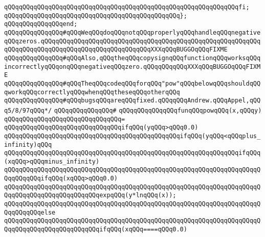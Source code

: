 \verb|qQQqqQQqqQQqqQQqqQQqqQQqqQQqqQQqqQQqqQQqqQQqqQQqqQQqqQQqqQQqqQQqfi;|\newline
\verb|qQQqqQQqqQQqqQQqqQQqqQQqqQQqqQQqqQQqqQQqqQQqqQQq};|\newline
\verb|qQQqqQQqqQQqqQQqend;|\newline
\newline
\verb|qQQqqQQqqQQqqQQq#qQQqWeqQQqdoqQQqnotqQQqproperlyqQQqhandleqQQqnegativeqQQqzeros.qQQqqQQqqQQqqQQqqQQqqQQqqQQqqQQqqQQqqQQqqQQqqQQqqQQqqQQqqQQqqQQqqQQqqQQqqQQqqQQqqQQqqQQqqQQqqQQqqQQqXXXqQQqBUGGOqQQqFIXME|\newline
\verb|qQQqqQQqqQQqqQQq#qQQqAlso,qQQqtheqQQqcopysignqQQqfunctionqQQqworksqQQqincorrectlyqQQqonqQQqnegativeqQQqzero.qQQqqQQqqQQqXXXqQQqBUGGOqQQqFIXME|\newline
\verb|qQQqqQQqqQQqqQQq#qQQqTheqQQqcodeqQQqforqQQq"pow"qQQqbelowqQQqshouldqQQqworkqQQqcorrectlyqQQqwhenqQQqtheseqQQqotherqQQq|\newline
\verb|qQQqqQQqqQQqqQQq#qQQqbugsqQQqareqQQqfixed.qQQqqQQqAndrew.qQQqAppel,qQQq5/8/97qQQq*/|\newline
\verb|qQQqqQQqqQQqqQQq#|\newline
\verb|qQQqqQQqqQQqqQQqfunqQQqpowqQQq(x,qQQqy)|\newline
\verb|qQQqqQQqqQQqqQQqqQQqqQQqqQQqqQQq=|\newline
\verb|qQQqqQQqqQQqqQQqqQQqqQQqqQQqqQQqifqQQq(yqQQq>qQQq0.0)|\newline
\newline
\verb|qQQqqQQqqQQqqQQqqQQqqQQqqQQqqQQqqQQqqQQqqQQqqQQqifqQQq(yqQQq<qQQqplus_infinity)qQQq|\newline
\newline
\verb|qQQqqQQqqQQqqQQqqQQqqQQqqQQqqQQqqQQqqQQqqQQqqQQqqQQqqQQqqQQqqQQqifqQQq(xqQQq>qQQqminus_infinity)|\newline
\newline
\verb|qQQqqQQqqQQqqQQqqQQqqQQqqQQqqQQqqQQqqQQqqQQqqQQqqQQqqQQqqQQqqQQqqQQqqQQqqQQqqQQqifqQQq(xqQQq>qQQq0.0)|\newline
\newline
\verb|qQQqqQQqqQQqqQQqqQQqqQQqqQQqqQQqqQQqqQQqqQQqqQQqqQQqqQQqqQQqqQQqqQQqqQQqqQQqqQQqqQQqqQQqqQQqqQQqexpqQQq(y*lnqQQq(x));|\newline
\newline
\verb|qQQqqQQqqQQqqQQqqQQqqQQqqQQqqQQqqQQqqQQqqQQqqQQqqQQqqQQqqQQqqQQqqQQqqQQqqQQqqQQqelse|\newline
\verb|qQQqqQQqqQQqqQQqqQQqqQQqqQQqqQQqqQQqqQQqqQQqqQQqqQQqqQQqqQQqqQQqqQQqqQQqqQQqqQQqqQQqqQQqqQQqqQQqifqQQq(xqQQq====qQQq0.0)|\newline
